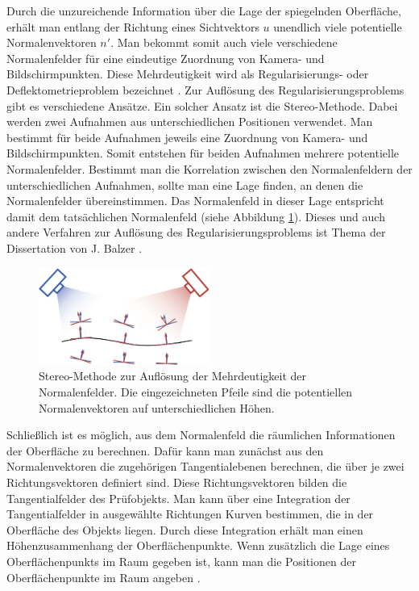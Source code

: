 \p
Durch die unzureichende Information über die Lage der spiegelnden Oberfläche, erhält man entlang der Richtung eines Sichtvektors $u$ unendlich viele potentielle Normalenvektoren $n'$.
Man bekommt somit auch viele verschiedene Normalenfelder für eine eindeutige Zuordnung von Kamera- und Bildschirmpunkten.
Diese Mehrdeutigkeit wird als Regularisierungs- oder Deflektometrieproblem bezeichnet \cite{regularisierungsproblem}.
Zur Auflösung des Regularisierungsproblems gibt es verschiedene Ansätze.
Ein solcher Ansatz ist die Stereo-Methode.
Dabei werden zwei Aufnahmen aus unterschiedlichen Positionen verwendet.
Man bestimmt für beide Aufnahmen jeweils eine Zuordnung von Kamera- und Bildschirmpunkten.
Somit entstehen für beiden Aufnahmen mehrere potentielle Normalenfelder.
Bestimmt man die Korrelation zwischen den Normalenfeldern der unterschiedlichen Aufnahmen, sollte man eine Lage finden, an denen die Normalenfelder übereinstimmen.
Das Normalenfeld in dieser Lage entspricht damit dem tatsächlichen Normalenfeld (siehe Abbildung \ref{img:stereoVerfahren}).
Dieses und auch andere Verfahren zur Auflösung des Regularisierungsproblems ist Thema der Dissertation von J. Balzer \cite{regularisierungsproblem}.
%
\begin{figure}[H]
	\centering
	\includegraphics[width=0.5\textwidth]{02_grundlagenDerDeflektometrie/rekonstruktion/rekonstruktionUndRegularisierungsproblem/figures/stereoVerfahren}
	\caption[Stereo-Methode zur Lösung des Regularisierungsproblems]{Stereo-Methode zur Auflösung der Mehrdeutigkeit der Normalenfelder. Die eingezeichneten Pfeile sind die potentiellen Normalenvektoren auf unterschiedlichen Höhen. \cite{stereoDeflektometrie}}
	\label{img:stereoVerfahren}
\end{figure}
%
\noindent
Schließlich ist es möglich, aus dem Normalenfeld die räumlichen Informationen der Oberfläche zu berechnen.
Dafür kann man zunächst aus den Normalenvektoren die zugehörigen Tangentialebenen berechnen, die über je zwei Richtungsvektoren definiert sind.
Diese Richtungsvektoren bilden die Tangentialfelder des Prüfobjekts.
Man kann über eine Integration der Tangentialfelder in ausgewählte Richtungen Kurven bestimmen, die in der Oberfläche des Objekts liegen.
Durch diese Integration erhält man einen Höhenzusammen\-hang der Oberflächenpunkte.
Wenn zusätzlich die Lage eines Oberflächenpunkts im Raum gegeben ist, kann man die Positionen der Oberflächenpunkte im Raum angeben \cite{kit_werling}.